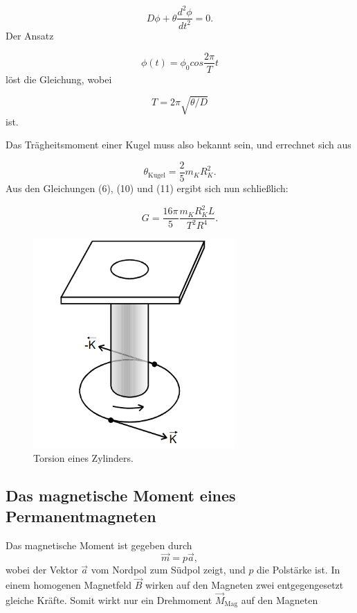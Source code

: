 \begin{equation}
  D\phi + \theta \frac{d^{2}\phi}{dt^{2}} = 0 .
\end{equation}
Der Ansatz

\begin{equation}
  \phi(t) = \phi_0 cos \frac{2\pi}{T}t 
\end{equation}
löst die Gleichung, wobei

\begin{equation}
  T = 2 \pi \sqrt{\theta/D}  
\end{equation}
ist.

\noindent Das Trägheitsmoment einer Kugel muss also bekannt sein, und errechnet sich aus

\begin{equation}
  \theta_\text{Kugel} = \frac{2}{5}m_K R_K^{2} .
\end{equation}
Aus den Gleichungen (6), (10) und (11) ergibt sich nun schließlich:

\begin{equation}
 G = \frac{16\pi}{5} \frac{m_K R_K^{2}L}{T^{2}R^{4}} .
\end{equation}

\begin{figure}[H]
 \centering
  \includegraphics[height=8cm]{Screenshot (9).png}
  \caption{Torsion eines Zylinders.\cite{kent}}
  \label{fig:drill}
\end{figure}


\subsection{Das magnetische Moment eines Permanentmagneten}
Das magnetische Moment ist gegeben durch
\begin{equation}
  \vec{m} = p \vec{a} ,
\end{equation}
wobei der Vektor $\vec{a}$ vom Nordpol zum Südpol zeigt, und $p$ die Polstärke ist.
In einem homogenen Magnetfeld $\vec{B}$ wirken auf den Magneten zwei entgegengesetzt gleiche Kräfte. Somit wirkt nur ein Drehmoment $\vec{M}_\text{Mag}$
auf den Magneten

